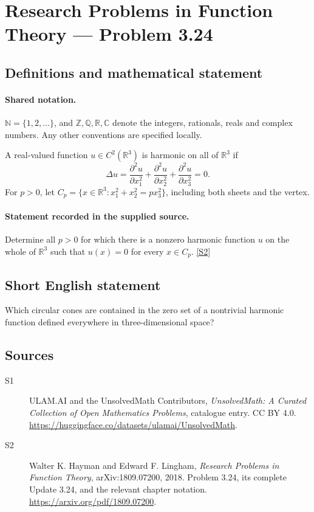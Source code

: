 \documentclass[11pt]{book}
\newcommand{\sref}[2]{\hyperlink{source:#1:#2}{[S#2]}}
\begin{document}
\section{Research Problems in Function Theory — Problem 3.24}\label{statement}

\subsection{Definitions and mathematical statement}

\paragraph{Shared notation.}$\mathbb N=\{1,2,\ldots\}$, and $\mathbb Z,\mathbb Q,\mathbb R,\mathbb C$ denote the integers, rationals, reals and complex numbers. Any other conventions are specified locally.


A real-valued function $u\in C^2(\mathbb R^3)$ is harmonic on all of $\mathbb R^3$ if
\[\Delta u=\frac{\partial^2u}{\partial x_1^2}+\frac{\partial^2u}{\partial x_2^2}+\frac{\partial^2u}{\partial x_3^2}=0.
\]
For $p>0$, let $C_p=\{x\in\mathbb R^3:x_1^2+x_2^2=px_3^2\}$, including both sheets and the vertex.
\paragraph{Statement recorded in the supplied source.}
Determine all $p>0$ for which there is a nonzero harmonic function $u$ on the whole of $\mathbb R^3$ such that $u(x)=0$ for every $x\in C_p$. \sref{statement}{2}
\subsection{Short English statement}
Which circular cones are contained in the zero set of a nontrivial harmonic function defined everywhere in three-dimensional space?
\subsection{Sources}
\begin{description}
\item[\hypertarget{source:statement:1}{S1}] ULAM.AI and the UnsolvedMath Contributors, \emph{UnsolvedMath: A Curated Collection of Open Mathematics Problems}, catalogue entry. CC BY 4.0. \url{https://huggingface.co/datasets/ulamai/UnsolvedMath}.
\item[\hypertarget{source:statement:2}{S2}] Walter K. Hayman and Edward F. Lingham, \emph{Research Problems in Function Theory}, arXiv:1809.07200, 2018. Problem 3.24, its complete Update 3.24, and the relevant chapter notation. \url{https://arxiv.org/pdf/1809.07200}.
\end{description}
\label{end:statement}
\end{document}
